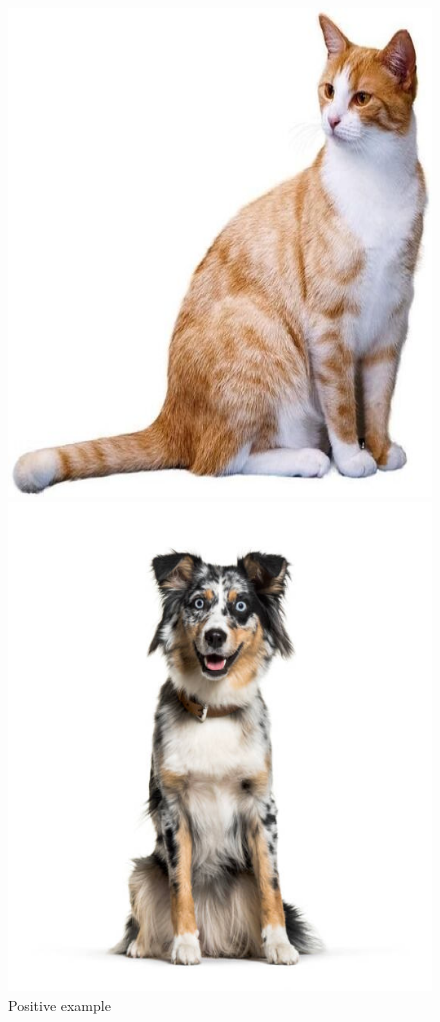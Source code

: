 \begin{nexample}
\begin{figure}[H]
          \includegraphics[width=\linewidth]{media/c2}
          \caption*{Positive example}\label{fig:c2}
        \endminipage
          \includegraphics[width=\linewidth]{media/doggo}

\end{figure}
\end{nexample}
